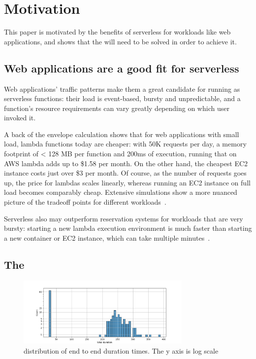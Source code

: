 \section{Motivation}\label{motivation}

This paper is motivated by the benefits of serverless for workloads like web
applications, and shows that the \problem{} will need to be solved in order to
achieve it.

\subsection{Web applications are a good fit for serverless}

Web applications' traffic patterns make them a great candidate for running as
serverless functions: their load is event-based, bursty and unpredictable, and a
function's resource requirements can vary greatly depending on which user
invoked it.

A back of the envelope calculation shows that for web applications with small
load, lambda functions today are cheaper: with 50K requests per day, a memory
footprint of < 128 MB per function and 200ms of execution, running that on AWS
lambda adds up to \$1.58 per month. On the other hand, the cheapest EC2 instance
costs just over \$3 per month. Of course, as the number of requests goes up, the
price for lambdas scales linearly, whereas running an EC2 instance on full load
becomes comparably cheap. Extensive simulations show a more nuanced picture of
the tradeoff points for different
workloads~\cite{econ-of-serverless,trek10-blog}.

Serverless also may outperform reservation systems for workloads that are very
bursty: starting a new lambda execution environment is much faster than starting
a new container or EC2 instance, which can take multiple
minutes~\cite{ec2-autoscaling}.


\subsection{The \problem{}}


\begin{figure}[t!]
    \centering
      \includegraphics[width=8.5cm]{img/lambda_total_durations.png}
      \caption{ distribution of end to end duration times. The y axis is log scale }
    \label{fig:lambda-total-durations}
\end{figure}


